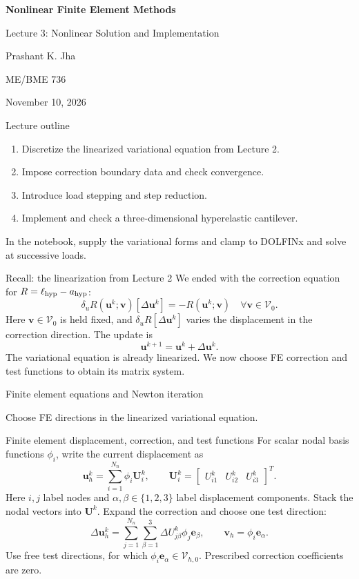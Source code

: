 \documentclass[11pt,aspectratio=169]{beamer}
\newcommand{\bu}{\bm u}
\newcommand{\bv}{\bm v}
\newcommand{\bU}{\bm U}
\newcommand{\Vzero}{\mathcal V_0}
\newcommand{\Vhzero}{\mathcal V_{h,0}}
\begin{document}
\begin{frame}
\centering\vfill
{\LARGE\bfseries Nonlinear Finite Element Methods\par}
\vspace{0.45cm}
{\Large Lecture 3: Nonlinear Solution and Implementation\par}
\vspace{0.45cm}
Prashant K. Jha\par
ME/BME 736\par
November 10, 2026
\vfill
\end{frame}

\begin{frame}{Lecture outline}
\begin{enumerate}
\item Discretize the linearized variational equation from Lecture 2.
\item Impose correction boundary data and check convergence.
\item Introduce load stepping and step reduction.
\item Implement and check a three-dimensional hyperelastic cantilever.
\end{enumerate}
\vspace{0.3cm}
In the notebook, supply the variational forms and clamp to DOLFINx and
solve at successive loads.
\end{frame}

\begin{frame}{Recall: the linearization from Lecture 2}
We ended with the correction equation for $R=\ell_{\rm hyp}-a_{\rm hyp}$:
\[
\boxed{\delta_uR(\bu^k;\bv)[\Delta\bu^k]=-R(\bu^k;\bv)
\quad\forall\bv\in\Vzero.}
\]
Here $\bv\in\Vzero$ is held fixed, and $\delta_uR[\Delta\bu^k]$ varies
the displacement in the correction direction. The update is
\[
\bu^{k+1}=\bu^k+\Delta\bu^k.
\]
The variational equation is already linearized. We now choose FE correction
and test functions to obtain its matrix system.
\end{frame}

\begin{frame}
\centering\vfill
{\LARGE Finite element equations and Newton iteration\par}
\vspace{0.4cm}
Choose FE directions in the linearized variational equation.
\vfill
\end{frame}

\begin{frame}{Finite element displacement, correction, and test functions}
For scalar nodal basis functions $\phi_i$, write the current displacement as
\[
\bu_h^k=\sum_{i=1}^{N_n}\phi_i\bm U_i^k,\qquad
\bm U_i^k=\begin{bmatrix}U_{i1}^k&U_{i2}^k&U_{i3}^k\end{bmatrix}^{T}.
\]
Here $i,j$ label nodes and $\alpha,\beta\in\{1,2,3\}$ label displacement
components. Stack the nodal vectors into $\bU^k$.
Expand the correction and choose one test direction:
\[
\Delta\bu_h^k=\sum_{j=1}^{N_n}\sum_{\beta=1}^3
\Delta U_{j\beta}^k\phi_j\bm e_\beta,
\qquad \bv_h=\phi_i\bm e_\alpha.
\]
Use free test directions, for which $\phi_i\bm e_\alpha\in\Vhzero$.
Prescribed correction coefficients are zero.
\end{frame}
\end{document}
